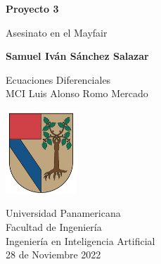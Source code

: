\documentclass[letter paper, 12pt]{report}
\begin{document}
\begin{titlepage}
   \begin{center}
        \vspace*{1cm}

        \textbf{Proyecto 3}

        \vspace{0.5cm}
            Asesinato en el Mayfair
                
        \vspace{1.5cm}

        \textbf{Samuel Iván Sánchez Salazar}

        \vfill
                
        Ecuaciones Diferenciales\\ 
        MCI Luis Alonso Romo Mercado
                
        \vspace{0.5cm}
        
        \includegraphics[width=0.2\textwidth]{logo}

        \vspace{0.5cm}
                
        Universidad Panamericana\\ 
        Facultad de Ingeniería\\
        Ingeniería en Inteligencia Artificial\\ 
        28 de Noviembre 2022
            
   \end{center}
\end{titlepage}






\end{document}
